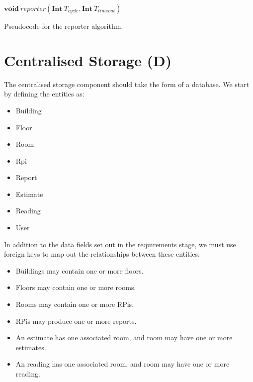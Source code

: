 \documentclass{l4proj}
\begin{document}
\begin{algorithm}
\DontPrintSemicolon
\nl $\textbf{void}~reporter(\textbf{Int}~T_{cycle}, \textbf{Int}~T_{timeout})$ \;
\nl {}
\;
\caption{Pseudocode for the reporter algorithm.}
\label{RPA}
\end{algorithm}

\section{Centralised Storage (D)}
The centralised storage component should take the form of a database. We start by defining the entities as:

\begin{itemize}	
  \item Building
  \item Floor
  \item Room
  \item Rpi
  \item Report
  \item Estimate
  \item Reading
  \item User
\end{itemize}

In addition to the data fields set out in the requirements stage, we must use foreign keys to map out the relationships between these entities:
\begin{itemize}
  \item Buildings may contain one or more floors.
  \item Floors may contain one or more rooms.	
  \item Rooms may contain one or more RPis.
  \item RPis may produce one or more reports.
  \item An estimate has one associated room, and room may have one or more estimates.
  \item An reading has one associated room, and room may have one or more reading.
\end{itemize}
\end{document}
